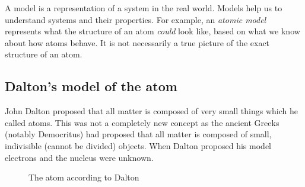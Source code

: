  { \label{m38756*meaningfhsst!!!underscore!!!id72}
      \label{m38756*id254584}A model is a representation of a system in the real world. Models help us to understand systems and their properties. For example, an \textsl{atomic model} represents what the structure of an atom \textsl{could} look like, based on what we know about how atoms behave. It is not necessarily a true picture of the exact structure of an atom. \par 
       } 
\vspace{-1cm}
\subsection*{Dalton's model of the atom}
\begin{minipage}{.5\textwidth}
John Dalton proposed that all matter is composed of very small things which he called atoms. This was not a completely new concept as the ancient Greeks (notably Democritus) had proposed that all matter is composed of small, indivisible (cannot be divided) objects. When Dalton proposed his model electrons and the nucleus were unknown.  
\end{minipage}
\begin{minipage}{.5\textwidth}
   \setcounter{subfigure}{0}
	\begin{figure}[H] %
    \begin{center}
\begin{minipage}{.8\textwidth}
\caption{The atom according to Dalton}
\end{minipage}
\label{fig:atom:dalton}
\end{center}
 \end{figure}
\end{minipage}

      \label{m38756*uid1}
